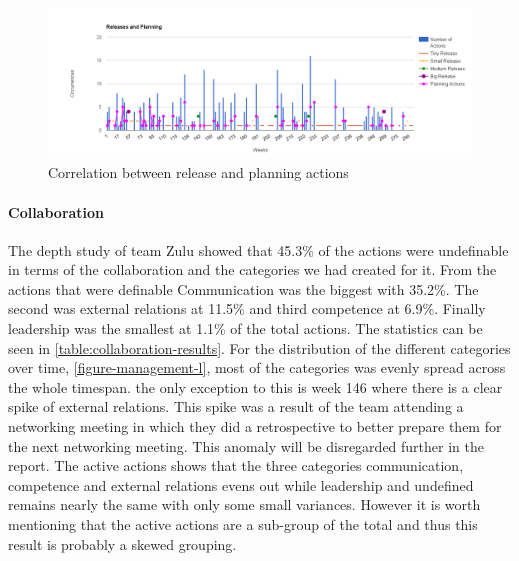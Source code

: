 \begin{figure}
	\centering
	\includegraphics[width=\textwidth, keepaspectratio]{figures/releases-and-planning.png}
	\caption{Correlation between release and planning actions}
	\label{figure:releases-and-planning}
\end{figure}
\afterpage{\clearpage}

\paragraph{Collaboration}
The depth study of team Zulu showed that 45.3\% of the actions were undefinable in terms of the collaboration and the categories we had created for it. From the actions that were definable Communication was the biggest with 35.2\%. The second was external relations at 11.5\% and third competence at 6.9\%. Finally leadership was the smallest at 1.1\% of the total actions. The statistics can be seen in \autoref{table:collaboration-results}. For the distribution of the different categories over time, \autoref{figure-management-l}, most of the categories was evenly spread across the whole timespan. the only exception to this is week 146 where there is a clear spike of external relations. This spike was a result of the team attending a networking meeting in which they did a retrospective to better prepare them for the next networking meeting. This anomaly will be disregarded further in the report. 
The active actions shows that the three categories communication, competence and external relations evens out while leadership and undefined remains nearly the same with only some small variances. However it is worth mentioning that the active actions are a sub-group of the total and thus this result is probably a skewed grouping. 

